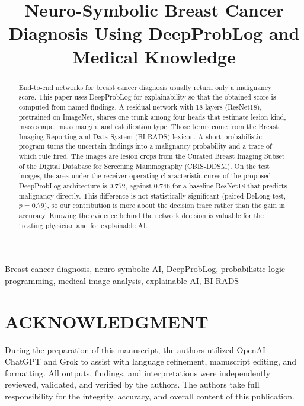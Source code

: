 \documentclass[conference]{IEEEtran}
\begin{document}
\title{Neuro-Symbolic Breast Cancer Diagnosis Using DeepProbLog and Medical Knowledge}

\author{
}

\maketitle
\pagestyle{plain}
\thispagestyle{plain}

\begin{abstract}
End-to-end networks for breast cancer diagnosis usually return only a malignancy score. This paper uses DeepProbLog for explainability so that the obtained score is computed from named findings. A residual network with 18 layers (ResNet18), pretrained on ImageNet, shares one trunk among four heads that estimate lesion kind, mass shape, mass margin, and calcification type. Those terms come from the Breast Imaging Reporting and Data System (BI-RADS) lexicon. A short probabilistic program turns the uncertain findings into a malignancy probability and a trace of which rule fired. The images are lesion crops from the Curated Breast Imaging Subset of the Digital Database for Screening Mammography (CBIS-DDSM). On the test images, the area under the receiver operating characteristic curve of the proposed DeepProbLog architecture is $0.752$, against $0.746$ for a baseline ResNet18 that predicts malignancy directly. This difference is not statistically significant (paired DeLong test, $p=0.79$), so our contribution is more about the decision trace rather than the gain in accuracy.  Knowing the evidence behind the network decision is valuable for the treating physician and for explainable AI.
\end{abstract}

\begin{IEEEkeywords}
Breast cancer diagnosis, neuro-symbolic AI, DeepProbLog, probabilistic logic programming, medical image analysis, explainable AI, BI-RADS
\end{IEEEkeywords}








\section*{ACKNOWLEDGMENT}
During the preparation of this manuscript, the authors utilized OpenAI ChatGPT and Grok to assist with language refinement, manuscript editing, and formatting. All outputs, findings, and interpretations were independently reviewed, validated, and verified by the authors. The authors take full responsibility for the integrity, accuracy, and overall content of this publication.



\end{document}
